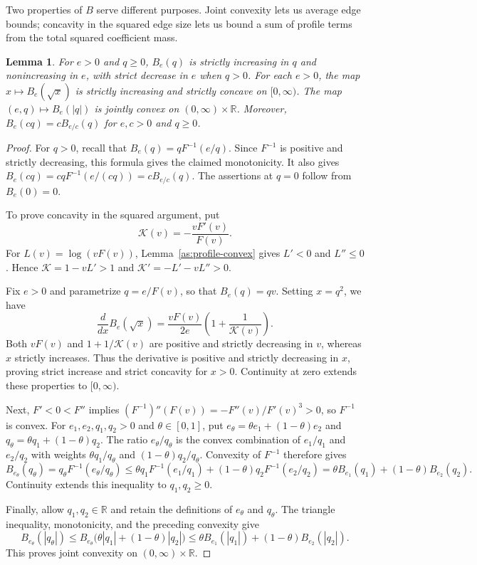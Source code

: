 \documentclass[11pt,letterpaper]{amsart}
\newcommand{\R}{\mathbb R}
\newcommand{\1}{\mathbf 1}
\newtheorem{lemma}[theorem]{Lemma}
\numberwithin{equation}{section}
\begin{document}
Two properties of $B$ serve different purposes. Joint convexity lets
us average edge bounds; concavity in the squared edge size lets us
bound a sum of profile terms from the total squared coefficient mass.

\begin{lemma}\label{u963:scalar}
For $e>0$ and $q\ge0$, $B_e(q)$ is strictly increasing in $q$
and nonincreasing in $e$, with strict decrease in $e$ when $q>0$.
For each $e>0$, the map $x\mapsto B_e(\sqrt x)$ is strictly
increasing and strictly concave on $[0,\infty)$.
The map $(e,q)\mapsto B_e(|q|)$ is jointly convex on
$(0,\infty)\times\R$.
Moreover, $B_e(cq)=cB_{e/c}(q)$ for $e,c>0$ and $q\ge0$.
\end{lemma}

\begin{proof}
For $q>0$, recall that $B_e(q)=qF^{-1}(e/q)$.
Since $F^{-1}$ is positive and strictly decreasing,
this formula gives the claimed monotonicity.
It also gives
$B_e(cq)=cqF^{-1}(e/(cq))=cB_{e/c}(q)$.
The assertions at $q=0$ follow from $B_e(0)=0$.

To prove concavity in the squared argument, put
\begin{equation}\label{eq:profile-elasticity}
 \mathcal K(v)=-\frac{vF'(v)}{F(v)}.
\end{equation}
For $L(v)=\log(vF(v))$, Lemma~\ref{as:profile-convex}
gives $L'<0$ and $L''\le0$.
Hence $\mathcal K=1-vL'>1$ and
$\mathcal K'=-L'-vL''>0$.

Fix $e>0$ and parametrize $q=e/F(v)$, so that
$B_e(q)=qv$. Setting $x=q^2$, we have
\[
 \frac{d}{dx}B_e(\sqrt x)
 =\frac{vF(v)}{2e}\left(1+\frac1{\mathcal K(v)}\right).
\]
Both $vF(v)$ and $1+1/\mathcal K(v)$ are positive and
strictly decreasing in $v$, whereas $x$ strictly increases.
Thus the derivative is positive and strictly decreasing in $x$,
proving strict increase and strict concavity for $x>0$.
Continuity at zero extends these properties to $[0,\infty)$.

Next, $F'<0<F''$ implies
$(F^{-1})''(F(v))=-F''(v)/F'(v)^3>0$,
so $F^{-1}$ is convex.
For $e_1,e_2,q_1,q_2>0$ and $\theta\in[0,1]$, put
$e_\theta=\theta e_1+(1-\theta)e_2$ and
$q_\theta=\theta q_1+(1-\theta)q_2$.
The ratio $e_\theta/q_\theta$ is the convex combination
of $e_1/q_1$ and $e_2/q_2$ with weights
$\theta q_1/q_\theta$ and $(1-\theta)q_2/q_\theta$.
Convexity of $F^{-1}$ therefore gives
\[
 B_{e_\theta}(q_\theta)=q_\theta F^{-1}(e_\theta/q_\theta)\le\theta q_1F^{-1}(e_1/q_1)
       +(1-\theta)q_2F^{-1}(e_2/q_2)=\theta B_{e_1}(q_1)+(1-\theta)B_{e_2}(q_2).
\]
Continuity extends this inequality to $q_1,q_2\ge0$.

Finally, allow $q_1,q_2\in\R$ and retain the definitions
of $e_\theta$ and $q_\theta$.
The triangle inequality, monotonicity, and the preceding
convexity give
\[
B_{e_\theta}(|q_\theta|)\le B_{e_\theta}\bigl(\theta|q_1|+(1-\theta)|q_2|\bigr)\le\theta B_{e_1}(|q_1|)
       +(1-\theta)B_{e_2}(|q_2|).
\]
This proves joint convexity on $(0,\infty)\times\R$.
\end{proof}
\end{document}
